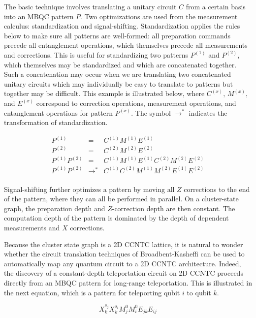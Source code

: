 The basic
technique involves translating a unitary circuit $C$ from a certain basis
into an MBQC pattern $P$. Two optimizations are used from the measurement
calculus: standardization and signal-shifting. Standardization applies
the rules below to make sure all patterns are well-formed: all
preparation commands precede all entanglement operations, which themselves
precede all measurements and corrections. This is useful for
standardizing two patterns $P^(1)$ and $P^(2)$, which themselves may be
standardized and which are concatenated together. Such a concatenation
may occur when we are translating two concatenated unitary circuits
which may individually be easy to translate to patterns but together may
be difficult. This example is illustrated below, where $C^{(x)}$,
$M^{(x)}$, and $E^{(x)}$ correspond to correction operations, measurement
operations, and entanglement operations for pattern $P^{(x)}$.
The symbol $\rightarrow^{*}$ indicates the transformation of standardization.

\begin{eqnarray}
P^{(1)} & = & C^{(1)}M^{(1)}E^{(1)} \\
P^{(2)} & = & C^{(2)}M^{(2)}E^{(2)} \\
P^{(1)}P^{(2)} & = & C^{(1)}M^{(1)}E^{(1)}C^{(2)}M^{(2)}E^{(2)} \\
P^{(1)}P^{(2)} & \rightarrow^{*} & C^{(1)}C^{(2)}M^{(1)}M^{(2)}E^{(1)}E^{(2)} \\
\end{eqnarray}

Signal-shifting further optimizes a pattern by moving all $Z$ corrections to
the end of the pattern, where they can all be performed in parallel. On a
cluster-state graph, the preparation depth and $Z$-correction depth are then
constant. The computation depth of the pattern is dominated by the
depth of dependent measurements and $X$ corrections.

Because the cluster state graph is a 2D CCNTC lattice, it is natural to
wonder whether the circuit translation techniques of Broadbent-Kasheffi
can be used to automatically map any quantum circuit to a 2D CCNTC
architecture. Indeed, the discovery of a constant-depth teleportation
circuit on \textsf{2D CCNTC} proceeds directly from an MBQC pattern
for long-range teleportation. This is illustrated in the next equation,
which is a pattern for teleporting qubit $i$ to qubit $k$.

\begin{equation}
X^{s_j}_k X^{s_i}_k M^0_j M^0_i E_{jk} E_{ij}
\end{equation}

